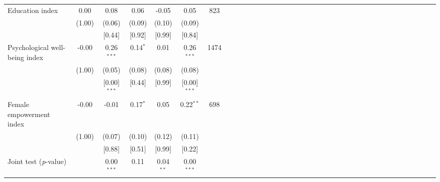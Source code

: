 {\begin{tabular}{l*{6}{SSSSSc}}
Education index&     0.00&     0.08&     0.06&    -0.05&     0.05&      823\\
          &   (1.00)&   (0.06)&   (0.09)&   (0.10)&   (0.09)&         \\
          &         &   [0.44]&   [0.92]&   [0.99]&   [0.84]&         \\
Psychological well-being index&    -0.00&0.26$^{***}$&0.14$^{*}$&     0.01&0.26$^{***}$&     1474\\
          &   (1.00)&   (0.05)&   (0.08)&   (0.08)&   (0.08)&         \\
          &         &[0.00]$^{***}$&   [0.44]&   [0.99]&[0.00]$^{***}$&         \\
Female empowerment index&    -0.00&    -0.01&0.17$^{*}$&     0.05&0.22$^{**}$&      698\\
          &   (1.00)&   (0.07)&   (0.10)&   (0.12)&   (0.11)&         \\
          &         &   [0.88]&   [0.51]&   [0.99]&   [0.22]&         \\
\midrule Joint test (\emph{p}-value)&         &0.00$^{***}$&     0.11&0.04$^{**}$&0.00$^{***}$&         \\
\bottomrule
\end{tabular}
}
